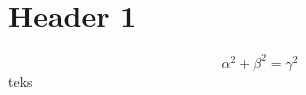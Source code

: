 \documentclass[10pt]{article}
\begin{document}
\section{Header 1}
\begin{equation}
\alpha^{2}+\beta^{2}=\gamma^{2}
\end{equation}
teks
\end{document}
